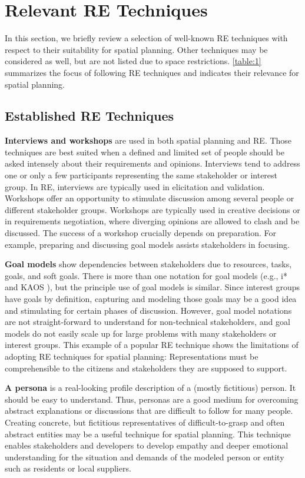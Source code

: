 \documentclass[conference]{IEEEtran}
\begin{document}
\section{Relevant RE Techniques}
\label{ch:4}
In this section, we briefly review a selection of well-known RE techniques with 
respect to their suitability for spatial planning. Other techniques may be 
considered as well, but are not listed due to space restrictions. \tablename{ 
\ref{table:1}} summarizes the focus of following RE techniques and indicates 
their relevance for spatial planning.

\subsection{Established RE Techniques}
\textbf{Interviews and workshops} are used in both spatial planning and RE. 
Those techniques are best suited when a defined and limited set of people 
should be asked intensely about their requirements and opinions. Interviews 
tend to address one or only a few participants representing the same 
stakeholder or interest group. In RE, interviews are typically used in 
elicitation and validation. Workshops offer an opportunity to stimulate 
discussion among several people or different stakeholder groups. Workshops are 
typically used in creative decisions or in requirements negotiation, where 
diverging opinions are allowed to clash and be discussed. The success of a 
workshop crucially depends on preparation. For example, preparing and 
discussing goal models assists stakeholders in focusing.

\textbf{Goal models} show dependencies between stakeholders due to resources, 
tasks, goals, and soft goals. There is more than one notation for goal models 
(e.g., i* \cite{Yu.1997} and KAOS \cite{Darimont.1997}), but the principle use 
of goal models is similar. Since interest groups have goals by definition, 
capturing and modeling those goals may be a good idea and stimulating for 
certain phases of discussion. However, goal model notations are not 
straight-forward to understand for non-technical stakeholders, and goal models 
do not easily scale up for large problems with many stakeholders or interest 
groups. This example of a popular RE technique shows the limitations of 
adopting RE techniques for spatial planning: Representations must be 
comprehensible to the citizens and stakeholders they are supposed to support. 

\textbf{A persona} is a real-looking profile description of a (mostly 
fictitious) person. It should be easy to understand. Thus, personas are a good 
medium for overcoming abstract explanations or discussions that are difficult 
to follow for many people. Creating concrete, but fictitious representatives of 
difficult-to-grasp and often abstract entities may be a useful technique for 
spatial planning. This technique enables stakeholders and developers to develop 
empathy and deeper emotional understanding for the situation and demands of the 
modeled person or entity such as residents or local suppliers.
\end{document}
